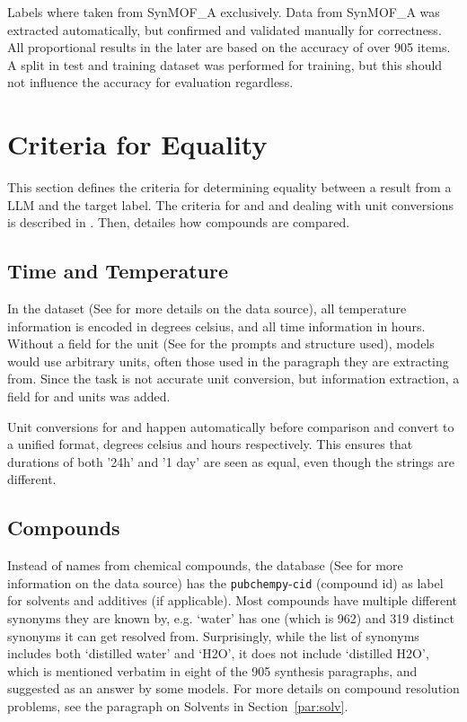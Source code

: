 Labels where taken from SynMOF\_A exclusively. Data from SynMOF\_A was extracted automatically, but confirmed and validated manually for correctness.
All proportional results in the later  are based on the accuracy of over 905 items.
A split in test and training dataset was performed for training, but this should not influence the accuracy for evaluation regardless.

\section{Criteria for Equality}\label{sec:equality}
This section defines the criteria for determining equality between a result from a \gls{LLM} and the target label.
The criteria for \ttemp and \ttime and dealing with unit conversions is described in .
Then,  detailes how compounds are compared.

\subsection{Time and Temperature}\label{sub:ttunit}
In the dataset (See  for more details on the data source), all temperature information is encoded in degrees celsius, and all time information in hours.
Without a field for the unit (See  for the prompts and structure used), models would use arbitrary units, often those used in the paragraph they are extracting from.
Since the task is not accurate unit conversion, but information extraction, a field for \ttemp and \ttime units was added.

Unit conversions for \ttemp and \ttime happen automatically before comparison and convert to a unified format, degrees celsius and hours respectively.
This ensures that durations of both '24h' and '1 day' are seen as equal, even though the strings are different.

\subsection{Compounds}\label{sub:compsolv}
Instead of names from chemical compounds, the database (See  for more information on the data source) has the \texttt{pubchempy}-\texttt{cid} (compound id) as label for solvents and additives (if applicable).
Most compounds have multiple different synonyms they are known by, e.g. `water' has one \cid (which is 962) and 319 distinct synonyms it can get resolved from.
Surprisingly, while the list of synonyms includes both `distilled water' and `H2O', it does not include `distilled H2O', which is mentioned verbatim in eight of the 905 synthesis paragraphs, and suggested as an answer by some models.
For more details on compound resolution problems, see the paragraph on Solvents in Section~\ref{par:solv}.

